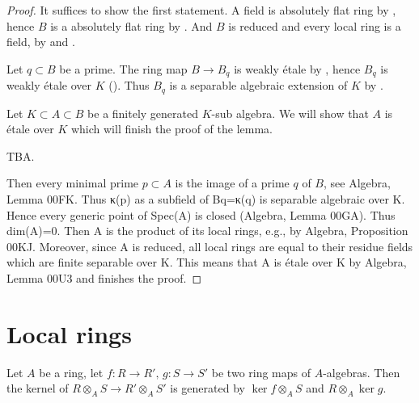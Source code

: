 \begin{proof}
    It suffices to show the first statement.
    A field is absolutely flat ring by ,
    hence $B$ is a absolutely flat ring by .
    And $B$ is reduced and every local
    ring is a field, by  and
    .

    Let $q \subset B$ be a prime. The ring map $B \to B_q$ is weakly étale by
    , hence $B_q$ is weakly étale over $K$
    (). Thus $B_q$ is a separable algebraic extension of $K$ by
    .

    Let $K \subset A \subset B$ be a finitely generated $K$-sub algebra. We will show that
    $A$ is étale over $K$ which will finish the proof of the lemma.

    TBA.

    Then every minimal prime
    $p \subset A$ is the image of a prime $q$ of $B$, see Algebra, Lemma 00FK.
    Thus κ(p) as a subfield of Bq=κ(q) is separable algebraic over K. Hence
    every generic point of Spec(A) is closed (Algebra, Lemma 00GA). Thus dim(A)=0. Then
    A is the product of its local rings, e.g., by Algebra, Proposition 00KJ. Moreover, since A is
    reduced, all local rings are equal to their residue fields which are finite separable over K.
    This means that A is étale over K by Algebra, Lemma 00U3 and finishes the proof.
\end{proof}

\section{Local rings}

\begin{lemma}
    \label{lem:ker-tensor-generated-by}
    Let $A$ be a ring, let $f: R \to R',\, g : S \to S'$ be two ring maps of $A$-algebras.
    Then the kernel of $R \otimes_A S \to R' \otimes_A S'$ is generated by $\ker f \otimes_A S$ and
    $R \otimes_A \ker g$.
    \mathlibok
\end{lemma}

